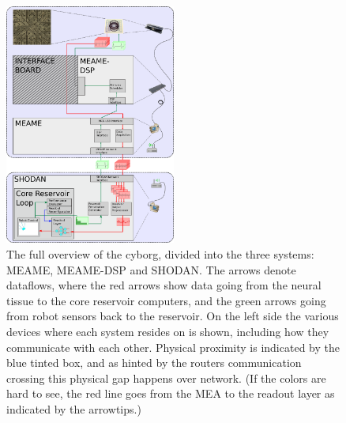 \begin{figure}[h]
  \centering
  \includegraphics[width=0.5\textwidth]{fig/system3.png}
  \caption{
    The full overview of the cyborg, divided into the three systems: MEAME,
    MEAME-DSP and SHODAN.
    The arrows denote dataflows, where the red arrows show data going from the
    neural tissue to the core reservoir computers, and the green arrows going
    from robot sensors back to the reservoir.
    On the left side the various devices where each system resides on is shown,
    including how they communicate with each other.
    Physical proximity is indicated by the blue tinted box, and as hinted by the
    routers communication crossing this physical gap happens over network.
    (If the colors are hard to see, the red line goes from the MEA to the
    readout layer as indicated by the arrowtips.)
  }
  \label{figOverview}
\end{figure}
%
